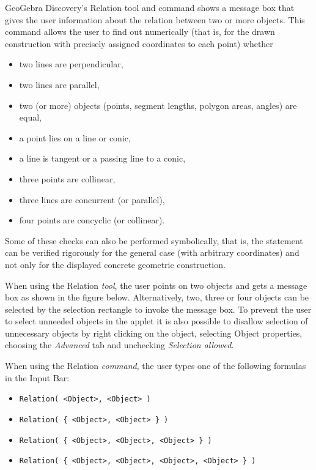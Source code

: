 \documentclass{article}
\begin{document}
GeoGebra Discovery's Relation tool and command shows a message box that gives the user information about the relation between two or more objects.
This command allows the user to find out numerically (that is, for the drawn construction with precisely assigned coordinates to each point) whether
\begin{itemize}
    \item two lines are perpendicular,
    \item two lines are parallel,
    \item two (or more) objects (points, segment lengths, polygon areas, angles) are equal,
    \item a point lies on a line or conic,
    \item a line is tangent or a passing line to a conic,
    \item three points are collinear,
    \item three lines are concurrent (or parallel),
    \item four points are concyclic (or collinear).
\end{itemize}
Some of these checks can also be performed symbolically, that is, the statement can be verified rigorously for the general case (with arbitrary coordinates) and not only for the displayed concrete geometric construction.

When using the Relation \textit{tool}, the user points on two objects and gets a message box as shown in the figure below. Alternatively, two, three or four objects can be selected by the selection rectangle to invoke the message box. To prevent the user to select unneeded objects in the applet it is also possible to disallow selection of unnecessary objects by
right clicking on the object, selecting Object properties, choosing the \textit{Advanced} tab and unchecking \textit{Selection allowed}.

When using the Relation \textit{command}, the user types one of the following formulas in the Input Bar:
\begin{itemize}
    \item \texttt{Relation( <Object>, <Object> )}
    \item \texttt{Relation( \{ <Object>, <Object> \} )}
    \item \texttt{Relation( \{ <Object>, <Object>, <Object> \} )}
    \item \texttt{Relation( \{ <Object>, <Object>, <Object>, <Object> \} )}
\end{itemize}
\end{document}
